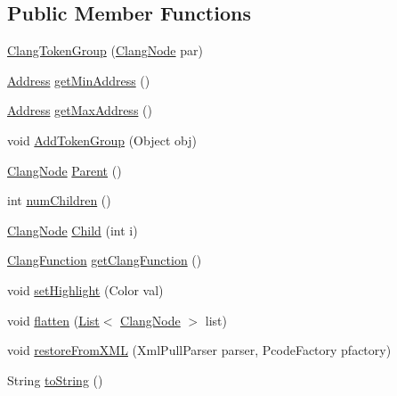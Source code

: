 \subsection*{Public Member Functions}
\begin{DoxyCompactItemize}
\item 
\mbox{\hyperlink{classghidra_1_1app_1_1decompiler_1_1_clang_token_group_a65e4520e9729f191227a27f10bbc2720}{Clang\+Token\+Group}} (\mbox{\hyperlink{interfaceghidra_1_1app_1_1decompiler_1_1_clang_node}{Clang\+Node}} par)
\item 
\mbox{\hyperlink{class_address}{Address}} \mbox{\hyperlink{classghidra_1_1app_1_1decompiler_1_1_clang_token_group_a2709c31b4d0db8b4f51d2191c33b7c2f}{get\+Min\+Address}} ()
\item 
\mbox{\hyperlink{class_address}{Address}} \mbox{\hyperlink{classghidra_1_1app_1_1decompiler_1_1_clang_token_group_ab5ef3f19b60d99c92f3afed8c5ae411d}{get\+Max\+Address}} ()
\item 
void \mbox{\hyperlink{classghidra_1_1app_1_1decompiler_1_1_clang_token_group_ae3ba0e1e0c86d34a85a6a58c84ece169}{Add\+Token\+Group}} (Object obj)
\item 
\mbox{\hyperlink{interfaceghidra_1_1app_1_1decompiler_1_1_clang_node}{Clang\+Node}} \mbox{\hyperlink{classghidra_1_1app_1_1decompiler_1_1_clang_token_group_a3f9dca7140c0110a3fa83c4b81f7886e}{Parent}} ()
\item 
int \mbox{\hyperlink{classghidra_1_1app_1_1decompiler_1_1_clang_token_group_a68d733e3de7a23187bc6e17891b01a63}{num\+Children}} ()
\item 
\mbox{\hyperlink{interfaceghidra_1_1app_1_1decompiler_1_1_clang_node}{Clang\+Node}} \mbox{\hyperlink{classghidra_1_1app_1_1decompiler_1_1_clang_token_group_a46fb87fe558080bdc0dd85072e915e90}{Child}} (int i)
\item 
\mbox{\hyperlink{classghidra_1_1app_1_1decompiler_1_1_clang_function}{Clang\+Function}} \mbox{\hyperlink{classghidra_1_1app_1_1decompiler_1_1_clang_token_group_a19473d47a4c0e53a664798541388518a}{get\+Clang\+Function}} ()
\item 
void \mbox{\hyperlink{classghidra_1_1app_1_1decompiler_1_1_clang_token_group_a1d6830afbeca1ea9affffb6fae945aff}{set\+Highlight}} (Color val)
\item 
void \mbox{\hyperlink{classghidra_1_1app_1_1decompiler_1_1_clang_token_group_ac469bdd22ba48a2941a40779f2e4630a}{flatten}} (\mbox{\hyperlink{xml_8hh_ab5ab62f46b3735557c125f91b40ac155}{List}}$<$ \mbox{\hyperlink{interfaceghidra_1_1app_1_1decompiler_1_1_clang_node}{Clang\+Node}} $>$ list)
\item 
void \mbox{\hyperlink{classghidra_1_1app_1_1decompiler_1_1_clang_token_group_ad6415521aaa042312b788162e577029c}{restore\+From\+X\+ML}} (Xml\+Pull\+Parser parser, Pcode\+Factory pfactory)
\item 
String \mbox{\hyperlink{classghidra_1_1app_1_1decompiler_1_1_clang_token_group_a3aac53106263a74cda840c5bea1be90f}{to\+String}} ()
\end{DoxyCompactItemize}


